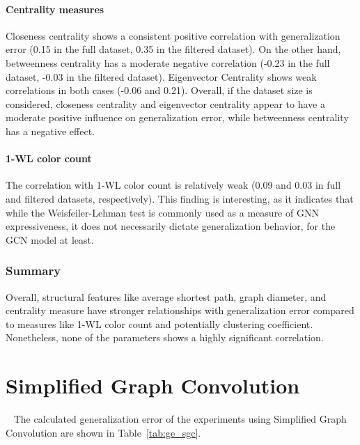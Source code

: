 \paragraph{Centrality measures}
Closeness centrality shows a consistent positive correlation with generalization error (0.15 in the full dataset, 0.35 in the filtered dataset). On the other hand, betweenness centrality has a moderate negative correlation (-0.23 in the full dataset, -0.03 in the filtered dataset). Eigenvector Centrality shows weak correlations in both cases (-0.06 and 0.21). Overall, if the dataset size is considered, closeness centrality and eigenvector centrality appear to have a moderate positive influence on generalization error, while betweenness centrality has a negative effect.

\paragraph{1-WL color count}
The correlation with 1-WL color count is relatively weak (0.09 and 0.03 in full and filtered datasets, respectively). This finding is interesting, as it indicates that while the Weisfeiler-Lehman test is commonly used as a measure of GNN expressiveness, it does not necessarily dictate generalization behavior, for the GCN model at least.

\subsubsection{Summary}
Overall, structural features like average shortest path, graph diameter, and  centrality measure have stronger relationships with generalization error compared to measures like 1-WL color count and potentially clustering coefficient. Nonetheless, none of the parameters shows a highly significant correlation.

\newpage

\section{Simplified Graph Convolution}~\label{sec:result_sgc}
The calculated generalization error of the experiments using Simplified Graph Convolution are shown in Table~\ref{tab:ge_sgc}.


